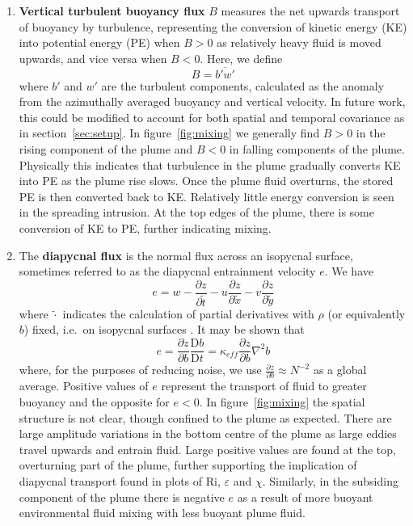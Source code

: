 \documentclass[a4paper]{article}
\begin{document}
\begin{enumerate}[label=(\alph*)]
	\item \textbf{Vertical turbulent buoyancy flux} $B$ measures the net upwards transport of buoyancy by
		turbulence, representing the conversion of kinetic energy (KE) into potential energy (PE) when $B > 0$
		as relatively heavy fluid is moved upwards, and vice versa when $B<0$. Here, we define
		\begin{equation}
			B = \overline{b'w'}
		\end{equation}
		where $b'$ and $w'$ are the turbulent components, calculated as the anomaly from the 
		azimuthally averaged buoyancy and vertical velocity. In future work, this could be modified to account
		for both spatial and temporal covariance as in section~\ref{sec:setup}. In figure~\ref{fig:mixing} we
		generally find $B > 0$ in the rising component of the plume and $B < 0$ in falling components of the
		plume. Physically this indicates that turbulence in the plume gradually converts KE into PE as the
		plume rise slows.  Once the plume fluid overturns, the stored PE is then converted back to KE.
		Relatively little energy conversion is seen in the spreading intrusion. At the top edges of the plume,
		there is some conversion of KE to PE, further indicating mixing.

	\item The \textbf{diapycnal flux} is the normal flux across an isopycnal surface, sometimes referred to as
		the diapycnal entrainment velocity $e$. We have
		\begin{equation}
			e = w - \frac{\partial z}{\partial \tilde{t}} - u\frac{\partial z}{\partial\tilde{x}} -
			v\frac{\partial z}{\partial\tilde{y}}
		\end{equation}
		where $\tilde{\cdot}$ indicates the calculation of partial derivatives with $\rho$ (or equivalently $b$)
		fixed, i.e.\ on isopycnal surfaces \citep{deszoeke1993}. It may be shown that
		\begin{equation}
			e = \frac{\partial z}{\partial b}\frac{\mathrm{D}b}{\mathrm{D}t} = \kappa_{eff} \frac{\partial
				z}{\partial b}\nabla^2 b
		\end{equation}
		where, for the purposes of reducing noise, we use $\frac{\partial z}{\partial b} \approx N^{-2}$ as a
		global average. Positive values of $e$ represent the transport of fluid to greater buoyancy and the
		opposite for $e < 0$. In figure~\ref{fig:mixing} the spatial structure is not clear, though confined
		to the plume as expected. There are large amplitude variations in the bottom centre of the plume as
		large eddies travel upwards and entrain fluid. Large positive values are found at the top, overturning
		part of the plume, further supporting the implication of diapycnal transport found in plots of
		$\mathrm{Ri}$, $\varepsilon$ and $\chi$. Similarly, in the subsiding component of the plume there is
		negative $e$ as a result of more buoyant environmental fluid mixing with less buoyant plume
		fluid.

\end{enumerate}
\end{document}
